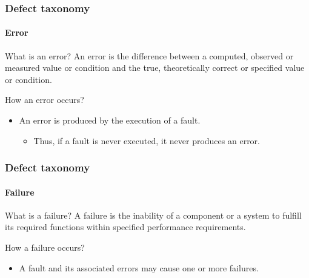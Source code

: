 \begin{frame}
\label{concept:error}
\frametitle{Defect taxonomy}
\framesubtitle{Error}

\begin{block:concept}{What is an error?}
An error is the difference between a computed, observed or measured value
or condition and the true, theoretically correct or specified value or
condition.
\end{block:concept}

\begin{block:fact}{How an error occurs?}
\begin{itemize}
	\item An error is produced by the execution of a fault.
	\begin{itemize}
		\item Thus, if a fault is never executed, it never produces an error.
	\end{itemize}
\end{itemize}
\end{block:fact}
\end{frame}


\begin{frame}
\label{concept:failure}
\frametitle{Defect taxonomy}
\framesubtitle{Failure}

\begin{block:concept}{What is a failure?}
A failure is the inability of a component or a system to fulfill its
required functions within specified performance requirements.
\end{block:concept}

\begin{block:fact}{How a failure occurs?}
\begin{itemize}
	\item A fault and its associated errors may cause one or more failures.
\end{itemize}
\end{block:fact}

\hfill
{}
\end{frame}



